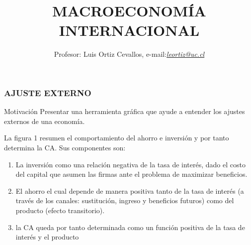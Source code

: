 \documentclass[10pt, xcolor=table, x11names]{beamer}
\author[Luis Ortiz Cevallos e-mail: \href{leortiz@uc.cl}{\textit{leortiz@uc.cl}}]{Profesor: Luis Ortiz Cevallos, e-mail:\href{leortiz@uc.cl}{\textit{leortiz@uc.cl}} }
\title[MACRO INTERNACIONAL]{\vspace*{1.0em} MACROECONOMÍA INTERNACIONAL}
\date[\href{https://ortiz-cevallos.github.io/luisortiz.github.io/ }{\textit{https://ortiz-cevallos.github.io/luisortiz.github.io/}}]{}
\begin{document}
\begin{frame}
\titlepage
\end{frame}


\begin{frame}[label=11]
	\frametitle{{\normalsize AJUSTE EXTERNO } {}}
	\begin{block} {Motivación}
		Presentar una herramienta gráfica que ayude a entender los ajustes externos de una economía.	
	\end{block}	
	La figura 1 resumen el comportamiento del ahorro e inversión y por tanto determina la CA. Sus componentes son:
	\begin{enumerate}
		\item La inversión como una relación negativa de la tasa de interés, dado el costo del capital que asumen las firmas ante el problema de maximizar beneficios.
		\item El ahorro el cual depende de manera positiva tanto de la tasa de interés (a través de los canales: sustitución, ingreso y beneficios futuros) como del producto (efecto transitorio).
		\item la CA queda por tanto determinada como un función positiva de la tasa de interés y el producto
	\end{enumerate} 
\end{frame}
\end{document}
